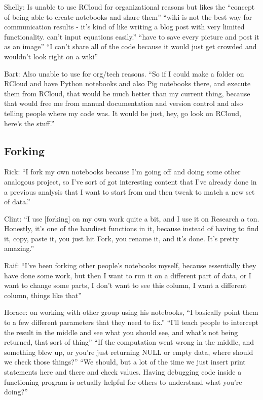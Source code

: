 Shelly: Is unable to use RCloud for organizational reasons but likes the
``concept of being able to create notebooks and share them'' ``wiki is not the
best way for communication results - it's kind of like writing a blog post with
very limited functionality. can't input equations easily.'' ``have to save every
picture and post it as an image'' ``I can't share all of the code because it
would just get crowded and wouldn't look right on a wiki''

Bart: Also unable to use for org/tech reasons. ``So if I could make a folder on
RCloud and have Python notebooks and also Pig notebooks there, and execute them
from RCloud, that would be much better than my current thing, because that would
free me from manual documentation and version control and also telling people
where my code was. It would be just, hey, go look on RCloud, here's the stuff.''



\subsection{Forking}
Rick: ``I fork my own notebooks because I'm going off and doing some other
analogous project, so I've sort of got interesting content that I've already
done in a previous analysis that I want to start from and then tweak to match a
new set of data.''

Clint: ``I use [forking] on my own work quite a bit, and I use it on Research a
ton. Honestly, it's one of the handiest functions in it, because instead of
having to find it, copy, paste it, you just hit Fork, you rename it, and it's
done. It's pretty amazing.''

Raif: ``I've been forking other people's notebooks myself, because essentially
they have done some work, but then I want to run it on a different part of data,
or I want to change some parts, I don't want to see this column, I want a
different column, things like that''

Horace: on working with other group using his notebooks, ``I basically point
them to a few different parameters that they need to fix.'' ``I'll teach people
to intercept the result in the middle and see what you should see, and what's
not being returned, that sort of thing'' ``If the computation went wrong in the
middle, and something blew up, or you're just returning NULL or empty data,
where should we check those things?'' ``We should, but a lot of the time we just
insert print statements here and there and check values. Having debugging code
inside a functioning program is actually helpful for others to understand what
you're doing?''

